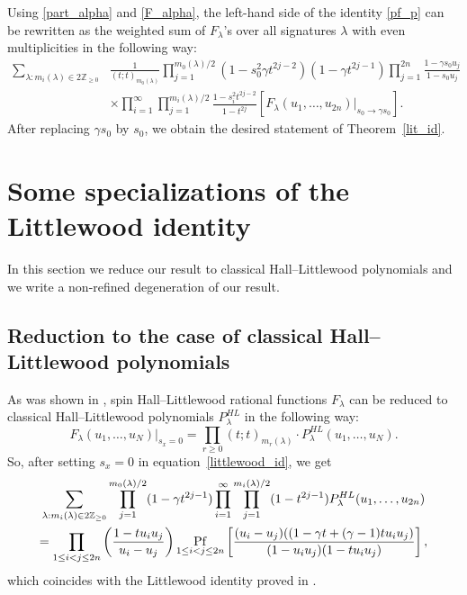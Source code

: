 \documentclass[ALCO,Unicode]{cedram}
\newcommand{\pf}{\mathop{\rm Pf}}
\begin{document}
Using \eqref{part_alpha} and \eqref{F_alpha}, the left-hand side of the identity \eqref{pf_p} can be rewritten as the weighted sum of $F_{\lambda}$'s over all signatures $\lambda$ with even multiplicities in the following way:
\begin{equation*}
\begin{split}
\sum_{\lambda: m_{i}(\lambda) \in 2 \mathbb{Z}_{\geq 0}} &\frac{1}{( t; t)_{m_{0}(\lambda)}} \prod_{j = 1}^{m_{0}(\lambda) / 2} (1 - s_{0}^2 \gamma t^{2j - 2})(1 - \gamma t^{2j-1}) \prod_{j=1}^{2n} \frac{1 - \gamma s_0 u_j}{1 - s_0 u_j}
\\
&\times \prod_{i = 1}^{\infty} \prod_{j = 1}^{m_{i}(\lambda) / 2} \frac{1 - s_{i}^2 t^{2j - 2}}{1 - t^{2j}} \left[F_{\lambda} (u_1, \dots, u_{2n})\Big\vert_{\text{$s_0\to \gamma s_0$}}\right].
\end{split}
\end{equation*}
After replacing $\gamma s_0$ by $s_0$, we obtain the desired statement of Theorem~\ref{lit_id}.

\section{Some specializations of the Littlewood identity} \label{sec: spec}

In this section we reduce our result
to classical Hall--Littlewood polynomials and we write a non-refined degeneration of our result.
\subsection{Reduction to the case of classical Hall--Littlewood polynomials}
As was shown in \cite{Pet21}, spin Hall--Littlewood rational functions $F_{\lambda}$ can be reduced to classical Hall--Littlewood polynomials $P_\lambda^{HL}$ in the following way:
\begin{equation}
F_{\lambda}(u_1, \dots, u_N)\Big\vert_{\text{$s_x=0$}} = \prod_{r\ge0}(t;t)_{m_r(\lambda)}\cdot
P_\lambda^{HL}(u_1,\ldots,u_N).
\end{equation}
So, after setting $ s_x = 0$ in equation~\eqref{littlewood_id}, we get
\begin{multline} \label{class_id}
\sum_{\lambda: m_{i}(\lambda) \in 2 \mathbb{Z}_{\geq 0}}  \prod_{j = 1}^{m_{0}(\lambda) / 2}(1 - \gamma t^{2j-1})\prod_{i = 1}^{\infty} \prod_{j = 1}^{m_{i}(\lambda) / 2} (1 - t^{2j-1}) P_{\lambda}^{HL} (u_1,\ldots,u_{2n})
\\
=
\prod_{1 \leq i<j \leq 2n}
\left(
\frac{1-t u_i u_j}{u_i - u_j}
\right) 
\pf_{1\leq i < j \leq 2n}
\left[
\frac{ (u_i - u_j)((1 - \gamma t+ (\gamma-1)tu_i u_j)}
{(1-u_i u_j) (1-t u_i u_j)}
\right],
\end{multline}
which coincides with the Littlewood identity proved in \cite[Theorem 5]{WZJ16}.
\end{document}
